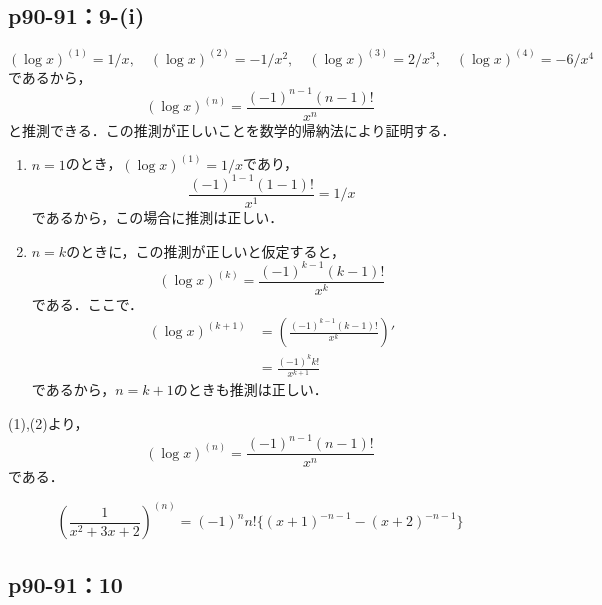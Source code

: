 \documentclass[uplatex,dvipdfmx,a4paper,10pt,fleqn]{jsarticle}
\begin{document}
\subsection*{p90-91：9-(i)}

\begin{tleftbar}
    \[
       ( \log x )^{(1)}= 1/x , \quad (\log x)^{(2)} = - 1/x^2 , \quad (\log x)^{(3)} = 2/x^3,\quad (\log x)^{(4)} = - 6 /x^4
    \]
    であるから，
    \[
        (\log x)^{(n)} = \frac{(-1)^{n-1}  (n-1)!}{x^n}
    \]
    と推測できる．この推測が正しいことを数学的帰納法により証明する．
    \begin{enumerate}
        \item $n=1$のとき，$(\log x)^{(1)} = 1/x$であり，
        \[
            \frac{(-1)^{1-1}  (1-1)!}{x^1}=1/x
        \]
        であるから，この場合に推測は正しい．
        \item $n=k$のときに，この推測が正しいと仮定すると，
        \[
            (\log x)^{(k)} = \frac{(-1)^{k-1}  (k-1)!}{x^k}
        \]
        である．ここで．
        \begin{align*} 
            (\log x)^{(k+1)} &= \left (\frac{(-1)^{k-1}  (k-1)!}{x^k} \right ) ' \\
            & = \frac{(-1)^k  k!}{x^{k+1}}
        \end{align*} 
        であるから，$n=k+1$のときも推測は正しい．
    \end{enumerate}
    (1),(2)より，
    \[
        (\log x)^{(n)} = \frac{(-1)^{n-1}  (n-1)!}{x^n}
     \]
     である．
\end{tleftbar}

\begin{tleftbar}
    \[
      \left(   \frac{1}{x^2+3x+2} \right)^{(n)} = (-1)^n n! \{ (x+1)^{-n-1} - (x+2)^{-n-1} \} 
    \]
\end{tleftbar}



\subsection*{p90-91：10}
\end{document}
